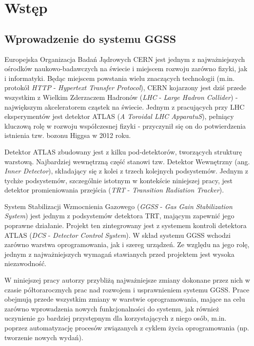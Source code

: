 \chapter{Wstęp}
\label{cha:wstep}

\section{Wprowadzenie do systemu GGSS}

Europejska Organizacja Badań Jądrowych CERN jest jednym z najważniejszych ośrodków naukowo-badawczych na świecie i miejscem rozwoju zarówno fizyki, jak i informatyki. Będąc miejscem powstania wielu znaczących technologii (m.in. protokół \emph{HTTP} - \emph{Hypertext Transfer Protocol}), CERN kojarzony jest dziś przede wszystkim z Wielkim Zderzaczem Hadronów (\emph{LHC} - \emph{Large Hadron Collider}) - największym akceleratorem cząstek na świecie. Jednym z pracujących przy LHC eksperymentów jest detektor ATLAS (\emph{A Toroidal LHC ApparatuS}), pełniący kluczową rolę w rozwoju współczesnej fizyki - przyczynił się on do potwierdzenia istnienia tzw. bozonu Higgsa w 2012 roku.

Detektor ATLAS zbudowany jest z kilku pod-detektorów, tworzących strukturę warstową. Najbardziej wewnętrzną część stanowi tzw. Detektor Wewnętrzny (ang. \emph{Inner Detector}), składający się z kolei z trzech kolejnych podsystemów. Jednym z tychże podsystemów, szczególnie istotnym w kontekście niniejszej pracy, jest detektor promieniowania przejścia (\emph{TRT} - \emph{Transition Radiation Tracker}).

System Stabilizacji Wzmocnienia Gazowego (\emph{GGSS} - \emph{Gas Gain Stabilization System}) jest jednym z podsystemów detektora TRT, mającym zapewnić jego poprawne działanie. Projekt ten zintegrowany jest z systemem kontroli detektora ATLAS (\emph{DCS} - \emph{Detector Control System}). W skład systemu GGSS wchodzi zarówno warstwa oprogramowania, jak i szereg urządzeń. Ze względu na jego rolę, jednym z najważniejszych wymagań stawianych przed projektem jest wysoka niezawodność.

W niniejszej pracy autorzy przybliżą najważniejsze zmiany dokonane przez nich w czasie półtorarocznych prac nad rozwojem i usprawnieniem systemu GGSS. Prace obejmują przede wszystkim zmiany w warstwie oprogramowania, mające na celu zarówno wprowadzenia nowych funkcjonalności do systemu, jak również uczynienie go bardziej przystępnym dla korzystających z niego osób, m.in. poprzez automatyzację procesów związanych z cyklem życia oprogramowania (np. tworzenie nowych wydań).



